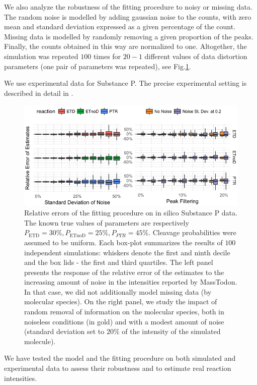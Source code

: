 \documentclass{llncs}
\begin{document}
We also analyze the robustness of the fitting procedure to noisy or missing data. The random noise is modelled by adding gaussian noise to the counts, with zero mean and standard deviation expressed as a given percentage of the count. Missing data is modelled by randomly removing a given proportion of the peaks. Finally, the counts obtained in this way are normalized to one. Altogether, the simulation was repeated $100$ times for $20-1$ different values of data distortion parameters (one pair of parameters was repeated), see Fig.\ref{fig::kokos}.

We use experimental data for Substance P. The precise experimental setting is described in detail in \cite{Lermyte2015-eb}.
\begin{figure}[h]
        \center
        \includegraphics[width=.9\textwidth]{kokos.png}
        \caption{ Relative errors of the fitting procedure on in silico Substance P data. The known true values of parameters are respectively $P_\text{ETD}=30\%, P_\text{ETnoD}= 25\%, P_{PTR}= 45\%$. Cleavage probabilities were assumed to be uniform. Each box-plot summarizes the results of $100$ independent simulations: whiskers denote the first and ninth decile and the box lids - the first and third quartiles. The left panel presents the response of the relative error of the estimates to the increasing amount of noise in the intensities reported by {\sc MassTodon}. In that case, we did not additionally model missing data (by molecular species). On the right panel, we study the impact of random removal of information on the molecular species, both in noiseless conditions (in gold) and with a modest amount of noise (standard deviation set to $20\%$ of the intensity of the simulated molecule).
        }\label{fig::kokos}
\end{figure}
We have tested the model and the fitting procedure on both simulated and experimental data to assess their robustness and to estimate real reaction intensities.
\end{document}
